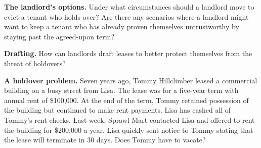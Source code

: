 
\item \textbf{The landlord's options.} Under what circumstances should a
landlord move to evict a tenant who holds over?  Are there any scenarios where
a landlord might want to keep a tenant who has already proven themselves
untrustworthy by staying past the agreed-upon term? 


\item \textbf{Drafting.} How can landlords draft leases to better protect
themselves from the threat of holdovers?


\item \textbf{A holdover problem.} Seven years ago, Tommy Hillclimber leased a
commercial building on a busy street from Lisa.  The lease was for a five-year
term with annual rent of \$100,000.  At the end of the term, Tommy retained
possession of the building but continued to make rent payments.  Lisa has
cashed all of Tommy's rent checks.  Last week, Sprawl-Mart contacted Lisa and
offered to rent the building for \$200,000 a year.  Lisa quickly sent notice to
Tommy stating that the lease will terminate in 30 days.  Does Tommy have to
vacate?

